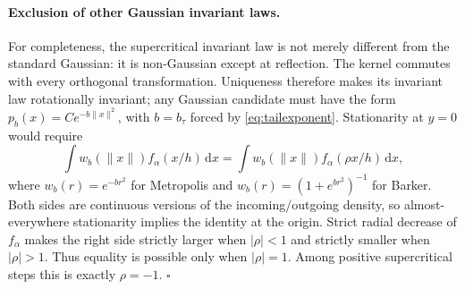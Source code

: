 \documentclass[pdflatex,iicol,sn-mathphys-ay]{sn-jnl}
\theoremstyle{definition}\newtheorem{definition}[theorem]{Definition}
\theoremstyle{remark}\newtheorem{remark}[theorem]{Remark}
\numberwithin{equation}{section}
\newcommand{\dd}{\,\mathrm d}\newcommand{\cA}{c_\alpha}\newcommand{\sg}{\operatorname{sigmoid}}
\newcommand{\1}{\mathbf 1}
\begin{document}
\paragraph{Exclusion of other Gaussian invariant laws.}
For completeness, the supercritical invariant law is not merely different from the standard Gaussian: it is non-Gaussian except at reflection. The kernel commutes with every orthogonal transformation. Uniqueness therefore makes its invariant law rotationally invariant; any Gaussian candidate must have the form $p_b(x)=C e^{-b\|x\|^2}$, with $b=b_\tau$ forced by \eqref{eq:tailexponent}. Stationarity at $y=0$ would require
\begin{equation}
\int w_b(\|x\|)f_\alpha(x/h)\dd x
=\int w_b(\|x\|)f_\alpha(\rho x/h)\dd x,\label{eq:originflux}
\end{equation}
where $w_b(r)=e^{-br^2}$ for Metropolis and $w_b(r)=(1+e^{br^2})^{-1}$ for Barker. Both sides are continuous versions of the incoming/outgoing density, so almost-everywhere stationarity implies the identity at the origin. Strict radial decrease of $f_\alpha$ makes the right side strictly larger when $|\rho|<1$ and strictly smaller when $|\rho|>1$. Thus equality is possible only when $|\rho|=1$. Among positive supercritical steps this is exactly $\rho=-1$.
\hfill$\square$
\end{document}
